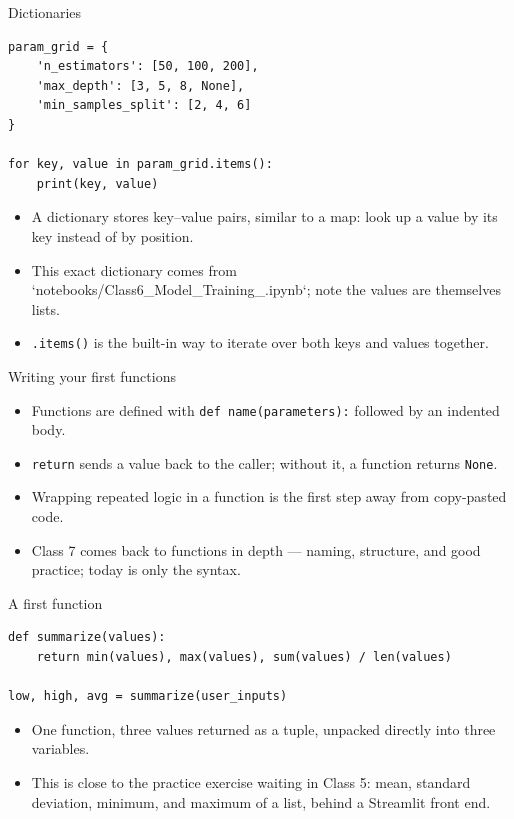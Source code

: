\begin{frame}[fragile]{Dictionaries}
\begin{lstlisting}[style=coursepython]
param_grid = {
    'n_estimators': [50, 100, 200],
    'max_depth': [3, 5, 8, None],
    'min_samples_split': [2, 4, 6]
}

for key, value in param_grid.items():
    print(key, value)
\end{lstlisting}
\begin{itemize}
\item A dictionary stores key--value pairs, similar to a map: look up a value by its key instead of by position.
\item This exact dictionary comes from `notebooks/Class6_Model_Training_.ipynb`; note the values are themselves lists.
\item \texttt{.items()} is the built-in way to iterate over both keys and values together.
\end{itemize}
\coursefooter
\end{frame}

\begin{frame}{Writing your first functions}
\begin{itemize}
\item Functions are defined with \texttt{def name(parameters):} followed by an indented body.
\item \texttt{return} sends a value back to the caller; without it, a function returns \texttt{None}.
\item Wrapping repeated logic in a function is the first step away from copy-pasted code.
\item Class 7 comes back to functions in depth --- naming, structure, and good practice; today is only the syntax.
\end{itemize}
\coursefooter
\end{frame}

\begin{frame}[fragile]{A first function}
\begin{lstlisting}[style=coursepython]
def summarize(values):
    return min(values), max(values), sum(values) / len(values)

low, high, avg = summarize(user_inputs)
\end{lstlisting}
\begin{itemize}
\item One function, three values returned as a tuple, unpacked directly into three variables.
\item This is close to the practice exercise waiting in Class 5: mean, standard deviation, minimum, and maximum of a list, behind a Streamlit front end.
\end{itemize}
\coursefooter
\end{frame}

